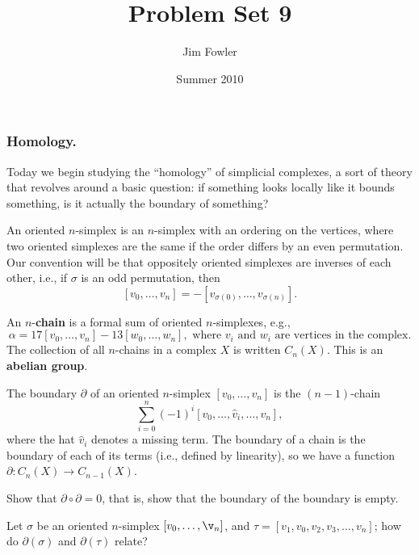 \documentclass[12pt]{pset}
\title{Problem Set 9}
\author{Jim Fowler}
\date{Summer 2010}
\begin{document}
\maketitle

\subsubsection*{Homology.} Today we begin studying the ``homology'' of
simplicial complexes, a sort of theory that revolves around a basic
question: if something looks locally like it bounds something, is it
actually the boundary of something?

\baselineskip
\parindent 0pt

\begin{definition*}
  An oriented $n$-simplex is an $n$-simplex with an ordering on the
  vertices, where two oriented simplexes are the same if the order
  differs by an even permutation.  Our convention will be that
  oppositely oriented simplexes are inverses of each other, i.e.,
  if $\sigma$ is an odd permutation, then
  $$
  [v_0,\ldots,v_n] = - [v_{\sigma(0)},\ldots,v_{\sigma(n)}].
  $$

  An $n$-\textbf{chain} is a formal sum of oriented $n$-simplexes,
  e.g.,
  $$
  \alpha = 17 [v_0,\ldots,v_n] - 13 [w_0,\ldots,w_n], \mbox{ where
    $v_i$ and $w_i$ are vertices in the complex.}
  $$
 The collection of all $n$-chains in a complex $X$ is written
  $C_n(X)$.  This is an \textbf{abelian group}.  

  The boundary $\partial$ of an oriented $n$-simplex
  $[v_0,\ldots,v_n]$ is the $(n-1)$-chain
  $$
  \sum_{i=0}^n (-1)^i [v_0,\ldots,\hat{v}_i,\ldots,v_n],
  $$
  where the hat $\hat{v}_i$ denotes a missing term.  The boundary of a
  chain is the boundary of each of its terms (i.e., defined by
  linearity), so we have a function $\partial : C_n(X) \to C_{n-1}(X)$.
\end{definition*}

\begin{requiredproblem}
  Show that $\partial \circ \partial = 0$, that is, show that the
  boundary of the boundary is empty.
\end{requiredproblem}

\begin{problem}
  Let $\sigma$ be an oriented $n$-simplex $[v_0,\ldots,\v_n]$, and
  $\tau = [v_1,v_0,v_2,v_3,\ldots,v_n]$; how do $\partial(\sigma)$
  and $\partial(\tau)$ relate?
\end{problem}
\end{document}
